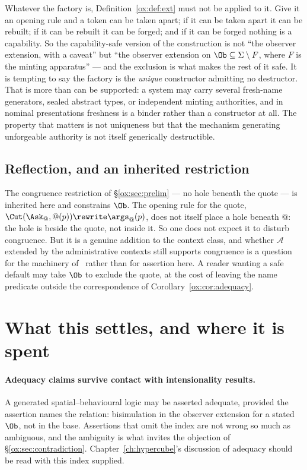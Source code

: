 \begin{remark}
\label{ox:rem:nodestructor}
Whatever the factory is, Definition~\ref{ox:def:ext} must not be applied to it.
Give it an opening rule and a token can be taken apart; if it can be taken apart it
can be rebuilt; if it can be rebuilt it can be forged; and if it can be forged
nothing is a capability. So the capability-safe version of the construction is not
``the observer extension, with a caveat'' but ``the observer extension on
$\Ob \subseteq \Sigma \setminus F$, where $F$ is the minting apparatus'' --- and the
exclusion is what makes the rest of it safe. It is tempting to say the factory is
the \emph{unique} constructor admitting no destructor. That is more than can be
supported: a system may carry several fresh-name generators, sealed abstract types,
or independent minting authorities, and in nominal presentations freshness is a
binder rather than a constructor at all. The property that matters is not
uniqueness but that the mechanism generating unforgeable authority is not itself
generically destructible.
\end{remark}

\subsection{Reflection, and an inherited restriction}

The congruence restriction of \S\ref{ox:sec:prelim} --- no hole beneath the quote
--- is inherited here and constrains $\Ob$. The opening rule for the quote,
$\Cut(\Ask_{@}, @(p)) \rewrite \args_{@}(p)$, does not itself place a hole beneath
$@$: the hole is beside the quote, not inside it. So one does not expect it to
disturb congruence. But it is a genuine addition to the context class, and whether
$\mathcal{A}$ extended by the administrative contexts still supports congruence is a
question for the machinery of~\cite{BIHOL} rather than for assertion here. A reader
wanting a safe default may take $\Ob$ to exclude the quote, at the cost of leaving
the name predicate outside the correspondence of
Corollary~\ref{ox:cor:adequacy}.

\section{What this settles, and where it is spent}
\label{ox:sec:settles}

\paragraph{Adequacy claims survive contact with intensionality results.}
A generated spatial--behavioural logic may be asserted adequate, provided the
assertion names the relation: bisimulation in the observer extension for a stated
$\Ob$, not in the base. Assertions that omit the index are not wrong so much as
ambiguous, and the ambiguity is what invites the objection of
\S\ref{ox:sec:contradiction}. Chapter~\ref{ch:hypercube}'s discussion of adequacy
should be read with this index supplied.

